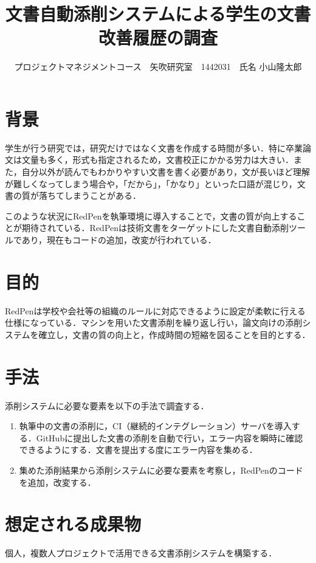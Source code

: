 \documentclass[uplatex,twocolumn,dvipdfmx]{jsarticle}
\title{\vspace{-5mm}\fontsize{14pt}{0pt}\selectfont 文書自動添削システムによる学生の文書改善履歴の調査}
\author{\normalsize プロジェクトマネジメントコース　矢吹研究室　1442031　氏名 小山隆太郎}
\date{}
\begin{document}
\fontsize{10.5pt}{\baselineskip}\selectfont
\maketitle





\section{背景}
学生が行う研究では，研究だけではなく文書を作成する時間が多い．特に卒業論文は文量も多く，形式も指定されるため，文書校正にかかる労力は大きい．また，自分以外が読んでもわかりやすい文書を書く必要があり，文が長いほど理解が難しくなってしまう場合や，「だから」，「かなり」といった口語が混じり，文書の質が落ちてしまうことがある．

このような状況にRedPen\cite{a}を執筆環境に導入することで，文書の質が向上することが期待されている．RedPenは技術文書をターゲットにした文書自動添削ツールであり，現在もコードの追加，改変が行われている．

\section{目的}
RedPenは学校や会社等の組織のルールに対応できるように設定が柔軟に行える仕様になっている．マシンを用いた文書添削を繰り返し行い，論文向けの添削システムを確立し，文書の質の向上と，作成時間の短縮を図ることを目的とする．

\section{手法}
添削システムに必要な要素を以下の手法で調査する．

\begin{enumerate}
 \item 執筆中の文書の添削に，CI（継続的インテグレーション）サーバを導入する．GitHubに提出した文書の添削を自動で行い，エラー内容を瞬時に確認できるようにする．文書を提出する度にエラー内容を集める\cite{b}．
 \item 集めた添削結果から添削システムに必要な要素を考察し，RedPenのコードを追加，改変する．
\end{enumerate}

\section{想定される成果物}
個人，複数人プロジェクトで活用できる文書添削システムを構築する．
\end{document}
